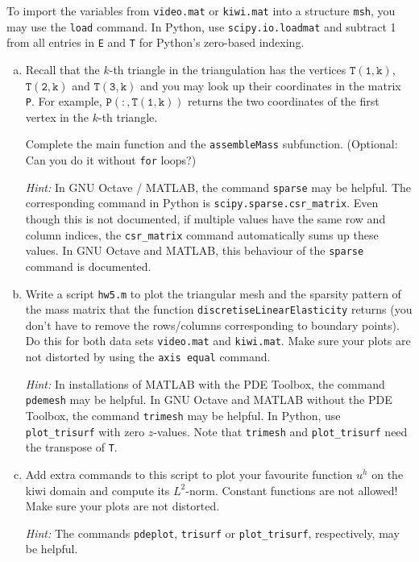\documentclass[10pt,letterpaper]{scrartcl}
\begin{document}
To import the variables from \texttt{video.mat} or \texttt{kiwi.mat} into a structure \texttt{msh}, you may use the \texttt{load} command. In \textsf{Python}, use \texttt{scipy.io.loadmat} and subtract 1 from all entries in \texttt{E} and \texttt{T} for \textsf{Python}'s zero-based indexing.

\begin{enumerate}[(a)]
\item Recall that the $k$-th triangle in the triangulation has the vertices $\mathtt{T(1,k)}$, $\mathtt{T(2,k)}$ and $\mathtt{T(3,k)}$ and you may look up their coordinates in the matrix \texttt{P}. For example, $\mathtt{P(:,T(1,k))}$ returns the two coordinates of the first vertex in the $k$-th triangle.

Complete the main function and the \texttt{assembleMass} subfunction. (Optional: Can you do it without \texttt{for} loops?)

\emph{Hint:} In \textsf{GNU Octave / MATLAB}, the command \texttt{sparse} may be helpful. The corresponding command in \textsf{Python} is \texttt{scipy.sparse.csr\_matrix}. Even though this is not documented, if multiple values have the same row and column indices, the \texttt{csr\_matrix} command automatically sums up these values. In \textsf{GNU Octave} and \textsf{MATLAB}, this behaviour of the \texttt{sparse} command is documented.

\item \faFilePictureO \: Write a script \texttt{hw5.m} to plot the triangular mesh and the sparsity pattern of the mass matrix that the function \texttt{discretiseLinearElasticity} returns (you don't have to remove the rows/columns corresponding to boundary points). Do this for both data sets \texttt{video.mat} and \texttt{kiwi.mat}. Make sure your plots are not distorted by using the \texttt{axis equal} command.


\emph{Hint:} In installations of \textsf{MATLAB} with the PDE Toolbox, the command \texttt{pdemesh} may be helpful. In \textsf{GNU Octave} and \textsf{MATLAB} without the PDE Toolbox, the command \texttt{trimesh} may be helpful. In \textsf{Python}, use \texttt{plot\_trisurf} with zero $z$-values. Note that \texttt{trimesh} and \texttt{plot\_trisurf} need the transpose of \texttt{T}.
\item \faFilePictureO \: Add extra commands to this script to plot your favourite function $u^h$ on the kiwi domain and compute its $L^2$-norm. Constant functions are not allowed! Make sure your plots are not distorted.

\emph{Hint:} The commands \texttt{pdeplot}, \texttt{trisurf} or \texttt{plot\_trisurf}, respectively, may be helpful.
\end{enumerate}
\end{document}
